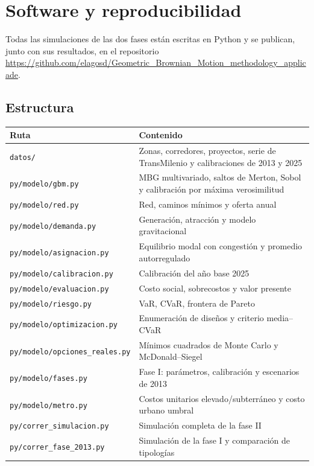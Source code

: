 \chapter{Software y reproducibilidad}\label{ap:software}

Todas las simulaciones de las dos fases están escritas en Python y se publican, junto con sus
resultados, en el repositorio
\url{https://github.com/elagosd/Geometric_Brownian_Motion_methodology_applicade}.

\section{Estructura}

{\small
\begin{longtable}{p{5.6cm}p{9.4cm}}
\toprule
Ruta & Contenido \\
\midrule
\endhead
\texttt{datos/} & Zonas, corredores, proyectos, serie de TransMilenio y calibraciones de 2013 y 2025 \\
\texttt{py/modelo/gbm.py} & MBG multivariado, saltos de Merton, Sobol y calibración por máxima verosimilitud \\
\texttt{py/modelo/red.py} & Red, caminos mínimos y oferta anual \\
\texttt{py/modelo/demanda.py} & Generación, atracción y modelo gravitacional \\
\texttt{py/modelo/asignacion.py} & Equilibrio modal con congestión y promedio autorregulado \\
\texttt{py/modelo/calibracion.py} & Calibración del año base 2025 \\
\texttt{py/modelo/evaluacion.py} & Costo social, sobrecostos y valor presente \\
\texttt{py/modelo/riesgo.py} & VaR, CVaR, frontera de Pareto \\
\texttt{py/modelo/optimizacion.py} & Enumeración de diseños y criterio media--CVaR \\
\texttt{py/modelo/opciones\_reales.py} & Mínimos cuadrados de Monte Carlo y McDonald--Siegel \\
\texttt{py/modelo/fases.py} & Fase I: parámetros, calibración y escenarios de 2013 \\
\texttt{py/modelo/metro.py} & Costos unitarios elevado/subterráneo y costo urbano umbral \\
\texttt{py/correr\_simulacion.py} & Simulación completa de la fase II \\
\texttt{py/correr\_fase\_2013.py} & Simulación de la fase I y comparación de tipologías \\

\end{longtable}}
